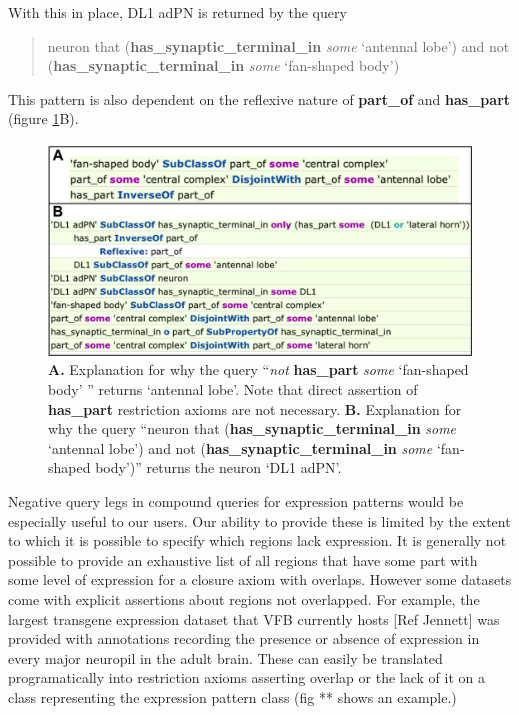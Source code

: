 \documentclass[runningheads,a4paper]{llncs}
\begin{document}
With this in place, DL1 adPN is returned by the query

\begin{quote}
neuron that (\textbf{has\_synaptic\_terminal\_in} \textit{some}
`antennal lobe') and not (\textbf{has\_synaptic\_terminal\_in}
\textit{some} `fan-shaped body') 
\end{quote}

This pattern is also dependent on the reflexive nature of
\textbf{part\_of} and \textbf{has\_part} (figure
\ref{fig:combined_explanation}B).

\begin{figure}
\centering
\includegraphics[width=120mm]{images/combined_explanation.png}
\caption{\textbf{A.} Explanation for why the query ``\textit{not}
   \textbf{has\_part} \textit{some} `fan-shaped body' '' returns
   `antennal lobe'.  Note that direct assertion of \textbf{has\_part}
   restriction axioms are not necessary. \textbf{B.} Explanation for
   why the query ``neuron that (\textbf{has\_synaptic\_terminal\_in}
   \textit{some} `antennal lobe') and not
   (\textbf{has\_synaptic\_terminal\_in} \textit{some} `fan-shaped
   body')'' returns the neuron `DL1 adPN'. }
\label{fig:combined_explanation}
\end{figure}

Negative query legs in compound queries for expression patterns would
be especially useful to our users.  Our ability to provide these is
limited by the extent to which it is possible to specify which regions
lack expression.  It is generally not possible to provide an
exhaustive list of all regions that have some part with some level of
expression for a closure axiom with overlaps.  However some datasets
come with explicit assertions about regions not overlapped.  For
example, the largest transgene expression dataset that VFB currently
hosts [Ref Jennett] was provided with annotations recording the
presence or absence of expression in every major neuropil in the adult
brain.  These can easily be translated programatically into restriction axioms
asserting overlap or the lack of it on a class representing the
expression pattern class (fig ** shows an example.)
\end{document}
